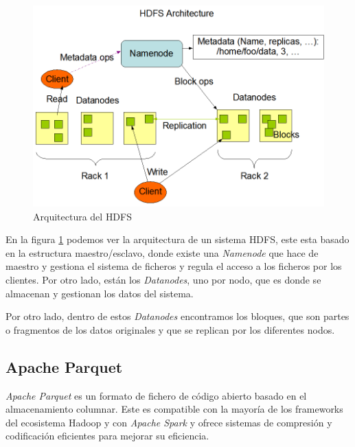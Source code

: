 \begin{figure}[htp!]
	\centering
	\caption{Arquitectura del \gls{HDFS} \cite{hadoop}}
	\label{hdfsarchitecture}
	\vspace{5pt}
	\includegraphics[scale=0.6]{graphics/hdfsarchitecture}
\end{figure}

En la figura \ref{hdfsarchitecture} podemos ver la arquitectura de un sistema \gls{HDFS}, este esta basado en la estructura maestro/esclavo, donde existe una \textit{Namenode} que hace de maestro y gestiona el sistema de ficheros y regula el acceso a los ficheros por los clientes. Por otro lado, están los \textit{Datanodes}, uno por nodo, que es donde se almacenan y gestionan los datos del sistema.

Por otro lado, dentro de estos \textit{Datanodes} encontramos los bloques, que son partes o fragmentos de los datos originales y que se replican por los diferentes nodos.

\subsection{Apache Parquet \label{parquetBeneficios}}
\textit{Apache Parquet} es un formato de fichero de código abierto basado en el almacenamiento columnar. Este es compatible con la mayoría de los \gls{framework}s del ecosistema Hadoop y con \textit{Apache Spark} y ofrece sistemas de compresión y codificación eficientes para mejorar su eficiencia.

